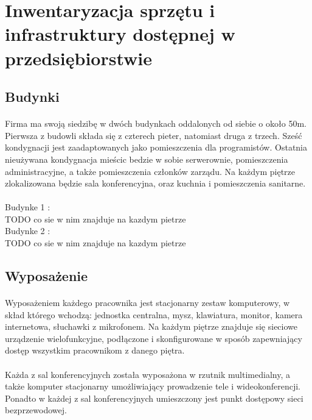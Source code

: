 \section{Inwentaryzacja sprzętu i infrastruktury dostępnej w przedsiębiorstwie}
\subsection{Budynki}
\paragraph{}
Firma ma swoją siedzibę w dwóch budynkach oddalonych od siebie o około 50m. Pierwsza z budowli składa się z czterech pieter, natomiast druga z trzech. Sześć kondygnacji jest zaadaptowanych jako pomieszczenia dla programistów. Ostatnia nieużywana kondygnacja mieścic bedzie w sobie serwerownie, pomieszczenia administracyjne, a także pomieszczenia członków zarządu. Na każdym piętrze zlokalizowana będzie sala konferencyjna, oraz kuchnia i pomieszczenia sanitarne.
\paragraph{}
Budynke 1 : \\
TODO co sie w nim znajduje na kazdym pietrze \\

Budynke 2 : \\
TODO co sie w nim znajduje na kazdym pietrze \\

\subsection{Wyposażenie}
\paragraph{}
Wyposażeniem każdego pracownika jest stacjonarny zestaw komputerowy, w skład którego wchodzą: jednostka centralna, mysz, klawiatura, monitor, kamera internetowa, słuchawki z mikrofonem.
Na każdym piętrze znajduje się sieciowe urządzenie wielofunkcyjne, podłączone i skonfigurowane w sposób zapewniający dostęp wszystkim pracownikom z danego piętra.

\paragraph{}
Każda z sal konferencyjnych została wyposażona w rzutnik multimedialny, a także komputer stacjonarny umożliwiający prowadzenie tele i wideokonferencji.
Ponadto w każdej z sal konferencyjnych umieszczony jest punkt dostępowy sieci bezprzewodowej.

